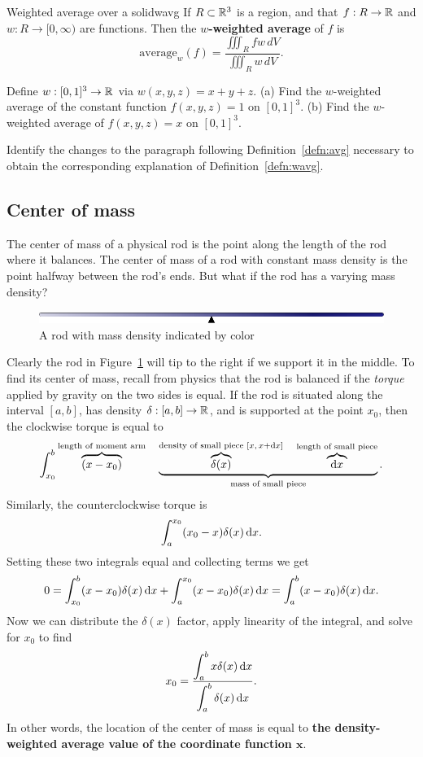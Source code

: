 \documentclass{watsonbook}
\begin{document}
\begin{defn}{Weighted average over a solid}{wavg}
  If $R\subset \mathbb{R}^3$ is a region, and that $f : R \to \mathbb{R}$ and $w : R \to [0,\infty)$ are functions. Then the \textbf{$w$-weighted average} of $f$ is
  \[
      \mathrm{average}_w(f) = \frac{\displaystyle{\iiint_R f w\, dV}}{\displaystyle{\iiint_R w \, dV}}. 
  \]
\end{defn}

\begin{exercise}{}{}
  Define $w : [0,1]^3 \to \mathbb{R}$ via $w(x,y,z) = x+y+z$. (a) Find the $w$-weighted average of the constant function $f(x,y,z) = 1$ on $[0,1]^3$. (b) Find the $w$-weighted average of $f(x,y,z) = x$ on $[0,1]^3$. 
\end{exercise}

\begin{exercise}{}{}
  Identify the changes to the paragraph following Definition~\ref{defn:avg} necessary to obtain the corresponding explanation of Definition~\ref{defn:wavg}. 
\end{exercise}

\subsection{Center of mass}

The center of mass of a physical rod is the point along the length of the rod where it balances. The center of mass of a rod with constant mass density is the point halfway between the rod's ends. But what if the rod has a varying mass density? 

\begin{figure}[h!]
  \centering
  \includegraphics[width=12cm]{figures/centerofmass}
  \caption{A rod with mass density indicated by color}
  \label{fig:rod} 
\end{figure}

Clearly the rod in Figure~\ref{fig:rod} will tip to the right if we support it in the middle. To find its center of mass, recall from physics that the rod is balanced if the \textit{torque} applied by gravity on the two sides is equal. If the rod is situated along the interval $[a,b]$, has density $\delta:[a,b] \to \mathbb{R}$, and is supported at the point $x_0$, then the clockwise torque is equal to
\[
  \int_{x_0}^b \overbrace{(x-x_0)}^{\text{length of moment arm}} \quad \underbrace{\overbrace{\delta(x)}^{\text{density of small piece }[x,\, x+\mathrm{d} x]} \quad  \overbrace{\mathrm{d} x}^{\text{length of small piece}}}_{\text{mass of small piece}}. 
\]
Similarly, the counterclockwise torque is
\[
  \int_{a}^{x_0} (x_0-x)\delta(x) \, \mathrm{d} x. 
\]
Setting these two integrals equal and collecting terms we get 
\[
  0 = \int_{x_0}^{b} (x-x_0)\delta(x) \, \mathrm{d} x + \int_{a}^{x_0} (x-x_0)\delta(x) \, \mathrm{d} x =
  \int_{a}^{b} (x-x_0)\delta(x) \, \mathrm{d} x. 
\]
Now we can distribute the $\delta(x)$ factor, apply linearity of the integral, and solve for $x_0$ to find
\[
  x_0 = \frac{\displaystyle{\int_a^b x \delta(x) \, \mathrm{d}x}}{\displaystyle{\int_a^b \delta(x) \, \mathrm{d}x}}. 
\]
In other words, the location of the center of mass is equal to \textbf{the density-weighted average value of the coordinate function $\mathbf{x}$}.
\end{document}
